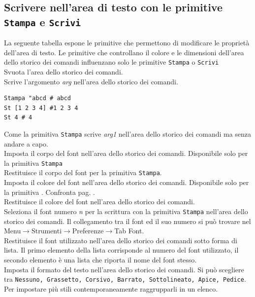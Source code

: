 \subsection{Scrivere nell'area di testo con le primitive \texttt{Stampa} e \texttt{Scrivi}}

La seguente tabella espone le primitive che permettono di modificare le proprietà dell'area di testo. Le primitive che controllano il colore e le dimensioni dell'area dello storico dei comandi influenzano solo le primitive  \texttt{Stampa} o \texttt{Scrivi}\\
Svuota l'area dello storico dei comandi.\\
Scrive l'argomento \textit{arg} nell'area dello storico dei comandi.
\begin{lstlisting}[caption="La primitiva \texttt{Stampa}"]
Stampa "abcd # abcd
St [1 2 3 4] #1 2 3 4
St 4 # 4
\end{lstlisting}
\noindent {}
Come la primitiva \texttt{Stampa} scrive \textit{arg1} nell'area dello storico dei comandi ma senza andare a capo.\\
 Imposta il corpo del font nell'area dello storico dei comandi. Disponibile solo per la primitiva \texttt{Stampa}\\
 Restituisce il corpo del font per la primitiva \texttt{Stampa}.\\
Imposta il colore del font nell'area dello storico dei comandi. Disponibile solo per la primitiva . Confronta pag. \pageref{couleurs}.\\
 Restituisce il colore del font nell'area dello storico dei comandi.\\
 Seleziona il font numero \textit{n} per la scrittura con la primitiva \texttt{Stampa} nell'area dello storico dei comandi. Il collegamento tra il font ed il suo numero si può trovare nel Menu$\to$Strumenti$\to$Preferenze$\to$Tab Font.\\
Restituisce il font utilizzato nell'area dello storico dei comandi sotto forma di lista. Il primo elemento della lista corrisponde al numero del font utilizzato, il secondo elemento è una lista che riporta il nome del font stesso.\\
Imposta il formato del testo nell'area dello storico dei comandi. Si può scegliere tra \texttt{Nessuno, Grassetto, Corsivo, Barrato, Sottolineato, Apice, Pedice}. Per impostare più stili contemporaneamente raggrupparli in un elenco.\\
